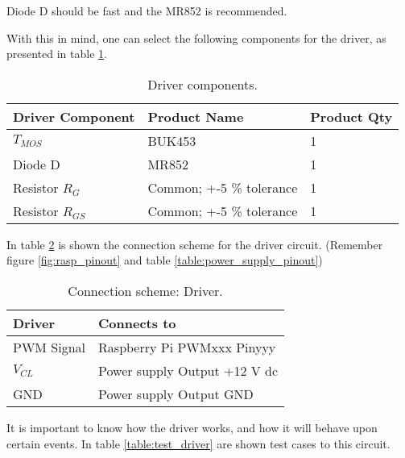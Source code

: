 Diode D should be fast and the MR852 is recommended.\linebreak

With this in mind, one can select the following components for the driver, as presented in table \ref{table:driver_components}.

\begin{table}[H]
	\centering
	\resizebox{\columnwidth}{!}
	{
		\begin{tabular}{|m{5cm}|m{6cm}|m{2.6cm}|}
			\hline
			\textbf{Driver Component} & \textbf{Product Name} & \textbf{Product Qty}
			\\\hline\hline
			
			\(T_{MOS}\) & BUK453 & 1
			\\\hline
			Diode D & MR852 & 1
			\\\hline
			Resistor \(R_{G}\) & Common; +-5 \% tolerance & 1
			\\\hline
			Resistor \(R_{GS}\) & Common; +-5 \% tolerance & 1
			\\\hline
		\end{tabular}
	}
	\caption{Driver components.}
	\label{table:driver_components}
\end{table}

In table \ref{table:connect_driver} is shown the connection scheme for the driver circuit. (Remember figure \ref{fig:rasp_pinout} and table \ref{table:power_supply_pinout})

\begin{table}[H]
	\centering
	\begin{tabular}{|m{5cm}|m{6cm}|}
		\hline
		\textbf{Driver} & \textbf{Connects to}
		\\\hline\hline
		
		PWM Signal & Raspberry Pi PWMxxx Pinyyy
		\\\hline
		\(V_{CL}\) & Power supply Output +12 V \ac{dc}
		\\\hline
		GND & Power supply Output GND
		\\\hline
	\end{tabular}
	
	\caption{Connection scheme: Driver.}
	\label{table:connect_driver}
\end{table}

It is important to know how the driver works, and how it will behave upon certain events. In table \ref{table:test_driver} are shown test cases to this circuit.

